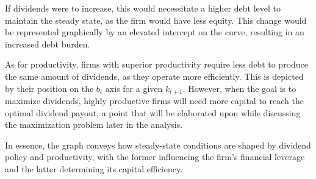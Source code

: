 \documentclass[12pt]{article}
\begin{document}
If dividends were to increase, this would necessitate a higher debt level to maintain the steady state, as the firm
would have less equity. This change would be represented graphically by an elevated intercept on the curve, resulting in
an increased debt burden. 

As for productivity, firms with superior productivity require less debt to produce the same amount of dividends, as they
operate more efficiently. This is depicted by their position on the \(b_t\) axis for a given \(k_{t+1}\). However, when
the goal is to maximize dividends, highly productive firms will need more capital to reach the optimal dividend payout,
a point that will be elaborated upon while discussing the maximization problem later in the analysis. 

In essence, the graph conveys how steady-state conditions are shaped by dividend policy and productivity, with the
former influencing the firm's financial leverage and the latter determining its capital efficiency. 
\end{document}
